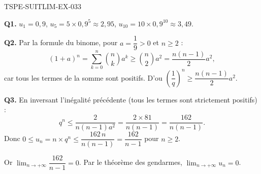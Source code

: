 \begin{corrige}{TSPE-SUITLIM-EX-033}

\textbf{Q1.} $u_1=0{,}9$, $u_5 = 5 \times 0{,}9^5 \approx 2{,}95$, $u_{10} = 10 \times 0{,}9^{10} \approx 3{,}49$.


\textbf{Q2.} Par la formule du binome, pour $a = \dfrac{1}{9} > 0$ et $n \geq 2$ :
\[
  (1+a)^n = \sum_{k=0}^{n}\binom{n}{k}a^k \geq \binom{n}{2}a^2 = \frac{n(n-1)}{2}a^2,
\]
car tous les termes de la somme sont positifs. D'ou $\left(\dfrac{1}{q}\right)^n \geq \dfrac{n(n-1)}{2}a^2$.

\textbf{Q3.} En inversant l'inégalité précédente (tous les termes sont strictement positifs) :
\[
  q^n \leq \frac{2}{n(n-1)a^2} = \frac{2 \times 81}{n(n-1)} = \frac{162}{n(n-1)}.
\]
Donc $0 \leq u_n = n \times q^n \leq \dfrac{162\,n}{n(n-1)} = \dfrac{162}{n-1}$ pour $n \geq 2$.

Or $\lim_{n \to +\infty} \dfrac{162}{n-1} = 0$. Par le théorème des gendarmes, $\boxed{\lim_{n \to +\infty} u_n = 0}$.

\end{corrige}
